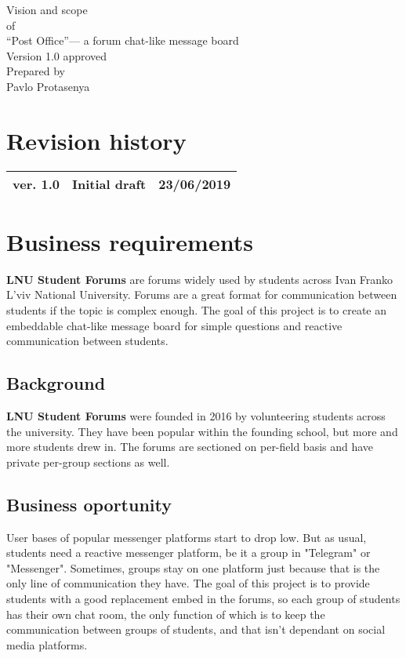 \documentclass[12pt]{article}
\begin{document}
	\centering
	\LARGE
	Vision and scope \\
	\large
	of \\
	\LARGE
	\textquotedblleft Post Office\textquotedblright --- a forum chat-like message board 
	\\
	\large
	\vfill
	Version 1.0 approved \\
	\vfill
	Prepared by \\
	Pavlo Protasenya
	\newpage
	\tableofcontents
	\newpage
	\section*{Revision history}
	\begin{tabular}{|l|l|l|}
		\firsthline
		ver. 1.0 & Initial draft & 23/06/2019\\
		\hline
	\end{tabular}
	\setcounter{page}{1}
	\flushleft
	\section{Business requirements}
	\textbf{LNU Student Forums} are forums widely used by students across Ivan Franko L'viv National University. Forums are a great format for communication between students if the topic is complex enough. The goal of this project is to create an embeddable chat-like message board for simple questions and reactive communication between students. 
	\subsection{Background}
	\textbf{LNU Student Forums} were founded in 2016 by volunteering students across the university. They have been popular within the founding school, but more and more students drew in. The forums are sectioned on per-field basis and have private per-group sections as well.
	\subsection{Business oportunity}
	User bases of popular messenger platforms start to drop low. But as usual, students need a reactive messenger platform, be it a group in "Telegram" or "Messenger". Sometimes, groups stay on one platform just because that is the only line of communication they have. The goal of this project is to provide students with a good replacement embed in the forums, so each group of students has their own chat room, the only function of which is to keep the communication between groups of students, and that isn't dependant on social media platforms.
\end{document}
